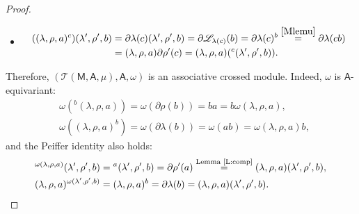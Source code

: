 \documentclass[12pt,reqno]{amsart}
\theoremstyle{plain}
\theoremstyle{definition}
\theoremstyle{remark}
\newcommand{\A}{\ensuremath{\mathsf{A}}}
\newcommand{\MM}{\ensuremath{\mathsf{M}}}
\newcommand{\T}{\ensuremath{\mathcal{T}}}
\newcommand{\LL}{\ensuremath{\mathcal{L}}}
\newcommand{\RR}{\ensuremath{\mathcal{R}}}
\numberwithin{equation}{section}
\begin{document}
\begin{proof}
\begin{itemize}
\begin{align*}
			({}^{b}(\lambda,\rho,a))^{c}&=(\partial\rho(b))^{c}=\partial\LL_{\rho(b)}(c)=\partial\rho(b)^{c}
			\stackrel{\eqref{Mbimul}}{=}\partial\,{}^{b}\lambda(c)=\partial\RR_{\lambda(c)}(b)\\
		   &={}^{b}\partial\lambda(c)={}^{b}((\lambda,\rho,a)^{c}).
		\end{align*}
		\item[\eqref{A6}:]
		\begin{align*}
			((\lambda,\rho,a)^{c})(\lambda',\rho',b)&=\partial\lambda(c)(\lambda',\rho',b)=\partial\LL_{\lambda(c)}(b)
			=\partial\lambda(c)^{b}\stackrel{\eqref{Mlemu}}{=}\partial\lambda(cb)\\
			&=(\lambda,\rho,a)\partial\rho'(c)=(\lambda,\rho,a)({}^{c}(\lambda',\rho',b)).
		\end{align*}
	\end{itemize}
	
	Therefore, $(\T(\MM,\A,\mu),\A,\omega)$ is an associative crossed module. Indeed, $\omega$ is $\A$-equivariant:
	\begin{align*}
		&\omega({}^{b}(\lambda,\rho,a))=\omega(\partial\rho(b))=ba=b\omega(\lambda,\rho,a),\\
		&\omega((\lambda,\rho,a)^{b})=\omega(\partial\lambda(b))=\omega(ab)=\omega(\lambda,\rho,a)b,
	\end{align*}
	and the Peiffer identity also holds:
	\begin{align*}
		&{}^{\omega(\lambda,\rho,a)}(\lambda',\rho',b)={}^{a}(\lambda',\rho',b)=\partial\rho'(a)\stackrel{\text{Lemma \ref{L:comp}}}{=}(\lambda,\rho,a)(\lambda',\rho',b),\\
		&(\lambda,\rho,a)^{\omega(\lambda',\rho',b)}=(\lambda,\rho,a)^{b}=\partial\lambda(b)=(\lambda,\rho,a)(\lambda',\rho',b).\qedhere
	\end{align*}
\end{proof}
\end{document}
